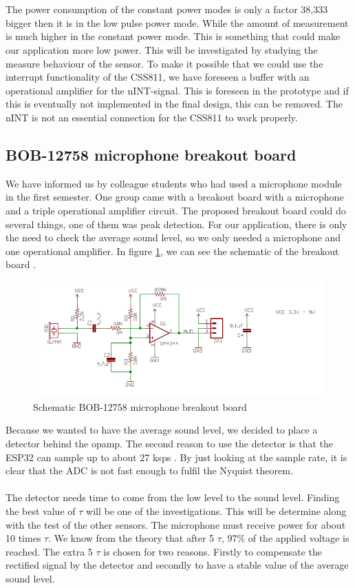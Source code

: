 \documentclass[11pt,a4paper]{article}
\begin{document}
\\ \\
The power consumption of the constant power modes is only a factor 38,333 bigger then it is in the low pulse power mode. While the amount of measurement is much higher in the constant power mode. This is something that could make our application more low power. This will be investigated by studying the measure behaviour of the sensor. To make it possible that we could use the interrupt functionality of the CSS811, we have foreseen a buffer with an operational amplifier for the nINT-signal.  This is foreseen in the prototype and if this is eventually not implemented in the final design, this can be removed. The nINT is not an essential connection for the CSS811 to work properly.


\subsection{BOB-12758 microphone breakout board}
We have informed us by colleague students who had used a microphone module in the first semester. One group came with a breakout board with a microphone and a triple operational amplifier circuit. The proposed breakout board could do several things, one of them was peak detection. For our application, there is only the need to check the average sound level, so we only needed a microphone and one operational amplifier. In figure \ref{fig:BOB-12758}, we can see the schematic of the breakout board \cite{bib:breakout_microphone}.

\begin{figure}[H]
	\centering
	\includegraphics[width=0.8\linewidth]{schematic_microphone_break_out_board.png}
	\caption{Schematic BOB-12758 microphone breakout board \cite{bib:breakout_microphone}}
	\label{fig:BOB-12758}
\end{figure}
Because we wanted to have the average sound level, we decided to place a detector behind the opamp. The second reason to use the detector is that the ESP32 can sample up to about 27 ksps \cite{ADC_speed}. By just looking at the sample rate, it is clear that the ADC is not fast enough to fulfil the Nyquist theorem. 
\\ \\
The detector needs time to come from the low level to the sound level. Finding the best value of $\tau$ will be one of the investigations. This will be determine along with the test of the other sensors. The microphone must receive power for about 10 times $\tau$. We know from the theory that after 5 $\tau$, 97\% of the applied voltage is reached. The extra 5 $\tau$ is chosen for two reasons. Firstly to compensate the rectified signal by the detector and secondly to have a stable value of the average sound level.
\end{document}
